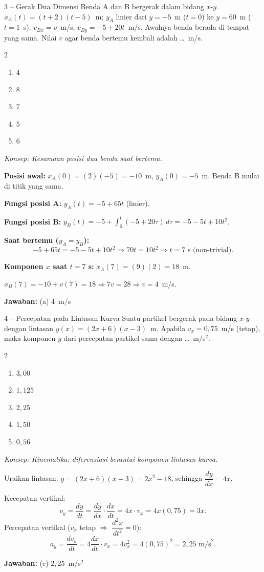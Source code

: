 \documentclass[11pt]{article}
\newcommand{\jawaban}[1]{%
  \noindent\colorbox{gold!30}{\parbox{\dimexpr\linewidth-2\fboxsep\relax}{%
    \textbf{Jawaban:} #1}}\par\smallskip}
\newcommand{\konsep}[1]{\textit{Konsep: #1.}\par\smallskip}
\newenvironment{pilB}{%
  \par\smallskip\begin{multicols}{2}
  \begin{enumerate}[label=(\alph*),leftmargin=*,itemsep=1pt,topsep=3pt]}%
  {\end{enumerate}\end{multicols}}
\begin{document}
\begin{soal}{3 -- Gerak Dua Dimensi}
Benda A dan B bergerak dalam bidang $x$-$y$. $x_A(t)=(t+2)(t-5)$~m; $y_A$ linier dari
$y=-5$~m ($t=0$) ke $y=60$~m ($t=1$~s). $v_{Bx}=v$~m/s, $v_{By}=-5+20t$~m/s. Awalnya
benda berada di tempat yang sama. Nilai $v$ agar benda bertemu kembali adalah \ldots~m/s.
\begin{pilB}
  \item $4$ \item $8$ \item $7$ \item $5$ \item $6$
\end{pilB}
\end{soal}
\begin{pembox}
\konsep{Kesamaan posisi dua benda saat bertemu}
\textbf{Posisi awal:} $x_A(0)=(2)(-5)=-10$~m, $y_A(0)=-5$~m. Benda B mulai di titik yang sama.

\textbf{Fungsi posisi A:} $y_A(t)=-5+65t$ (linier).

\textbf{Fungsi posisi B:} $y_B(t)=-5+\displaystyle\int_0^t(-5+20\tau)\,d\tau=-5-5t+10t^2$.

\textbf{Saat bertemu ($y_A=y_B$):}
\[
-5+65t = -5-5t+10t^2 \Rightarrow 70t = 10t^2 \Rightarrow t=7\text{ s (non-trivial)}.
\]

\textbf{Komponen $x$ saat $t=7$ s:} $x_A(7)=(9)(2)=18$~m.

$x_B(7)=-10+v(7)=18 \Rightarrow 7v=28 \Rightarrow v=4$~m/s.
\jawaban{(a) $4$~m/s}
\end{pembox}

\begin{soal}{4 -- Percepatan pada Lintasan Kurva}
Suatu partikel bergerak pada bidang $x$-$y$ dengan lintasan $y(x)=(2x+6)(x-3)$~m.
Apabila $v_x=0{,}75$~m/s (tetap), maka komponen $y$ dari percepatan partikel sama
dengan \ldots~m/s$^2$.
\begin{pilB}
  \item $3{,}00$ \item $1{,}125$ \item $2{,}25$ \item $1{,}50$ \item $0{,}56$
\end{pilB}
\end{soal}
\begin{pembox}
\konsep{Kinematika: diferensiasi berantai komponen lintasan kurva}
Uraikan lintasan: $y=(2x+6)(x-3)=2x^2-18$, sehingga $\dfrac{dy}{dx}=4x$.

Kecepatan vertikal:
\[
v_y = \frac{dy}{dt} = \frac{dy}{dx}\cdot\frac{dx}{dt} = 4x\cdot v_x = 4x(0{,}75) = 3x.
\]
Percepatan vertikal ($v_x$ tetap $\Rightarrow$ $\dfrac{d^2x}{dt^2}=0$):
\[
a_y = \frac{dv_y}{dt} = 4\frac{dx}{dt}\cdot v_x = 4v_x^2 = 4(0{,}75)^2 = 2{,}25\text{ m/s}^2.
\]
\jawaban{(c) $2{,}25$~m/s$^2$}
\end{pembox}
\end{document}
